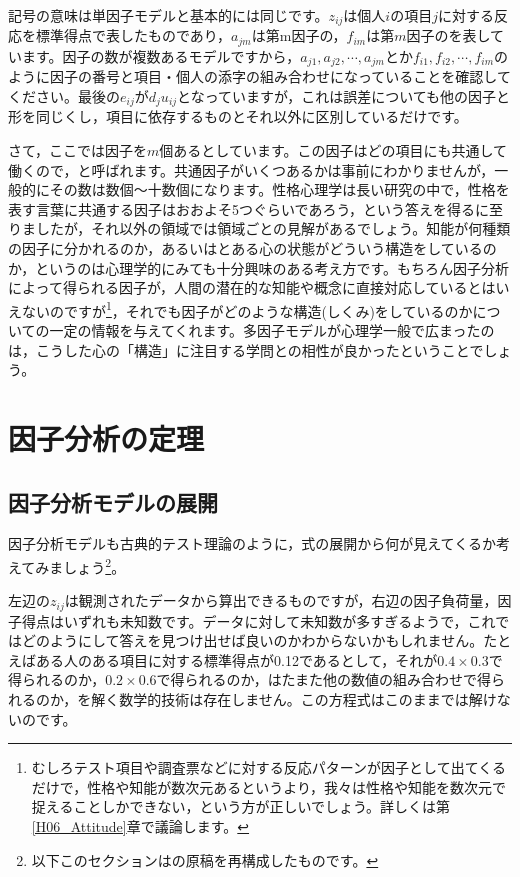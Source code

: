 \documentclass{ltjsbook}
\begin{document}
記号の意味は単因子モデルと基本的には同じです。$z_{ij}$は個人$i$の項目$j$に対する反応を標準得点で表したものであり，$a_{jm}$は第m因子の，$f_{im}$は第$m$因子のを表しています。因子の数が複数あるモデルですから，$a_{j1},a_{j2},\cdots, a_{jm}$とか$f_{i1},f_{i2},\cdots, f_{im}$のように因子の番号と項目・個人の添字の組み合わせになっていることを確認してください。最後の$e_{ij}$が$d_j u_{ij}$となっていますが，これは誤差についても他の因子と形を同じくし，項目に依存するものとそれ以外に区別しているだけです。

さて，ここでは因子を$m$個あるとしています。この因子はどの項目にも共通して働くので，と呼ばれます。共通因子がいくつあるかは事前にわかりませんが，一般的にその数は数個〜十数個になります。性格心理学は長い研究の中で，性格を表す言葉に共通する因子はおおよそ5つぐらいであろう，という答えを得るに至りましたが，それ以外の領域では領域ごとの見解があるでしょう。知能が何種類の因子に分かれるのか，あるいはとある心の状態がどういう構造をしているのか，というのは心理学的にみても十分興味のある考え方です。もちろん因子分析によって得られる因子が，人間の潜在的な知能や概念に直接対応しているとはいえないのですが\footnote{むしろテスト項目や調査票などに対する反応パターンが因子として出てくるだけで，性格や知能が数次元あるというより，我々は性格や知能を数次元で捉えることしかできない，という方が正しいでしょう。詳しくは第\ref{H06_Attitude}章で議論します。}，それでも因子がどのような構造(しくみ)をしているのかについての一定の情報を与えてくれます。多因子モデルが心理学一般で広まったのは，こうした心の「構造」に注目する学問との相性が良かったということでしょう。

\section{因子分析の定理}
\subsection{因子分析モデルの展開}
因子分析モデルも古典的テスト理論のように，式の展開から何が見えてくるか考えてみましょう\footnote{以下このセクションは\textcite{kosugi2018}の原稿を再構成したものです。}。

左辺の$z_{ij}$は観測されたデータから算出できるものですが，右辺の因子負荷量，因子得点はいずれも未知数です。データに対して未知数が多すぎるようで，これではどのようにして答えを見つけ出せば良いのかわからないかもしれません。たとえばある人のある項目に対する標準得点が0.12であるとして，それが$0.4 \times 0.3$で得られるのか，$0.2 \times 0.6$で得られるのか，はたまた他の数値の組み合わせで得られるのか，を解く数学的技術は存在しません。この方程式はこのままでは解けないのです。
\end{document}
